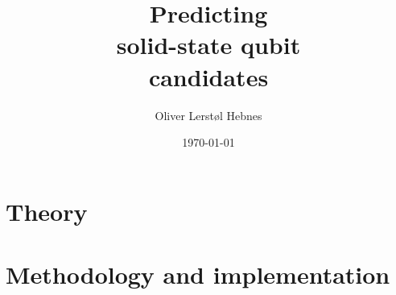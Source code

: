 \documentclass[twoside, english, notitlepage, 12pt]{uiofysmaster}
\author{Oliver Lerstøl Hebnes}
\title{Predicting\\
solid-state qubit\\
candidates
}
\date{\today}
\begin{document}
\hypersetup{pageanchor=false}
\frontmatter
    \maketitle



    \setcounter{tocdepth}{1}
    \tableofcontents

\mainmatter

    \part{Theory}
        
        
        

    \part{Methodology and implementation}
        

\end{document}
